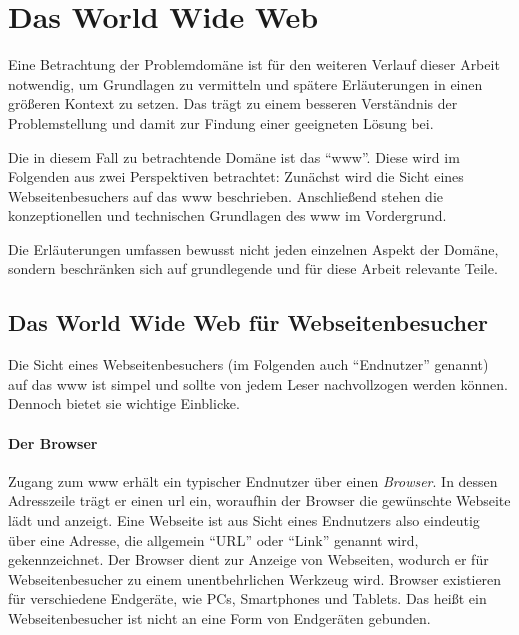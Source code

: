 \section{Das World Wide Web}
    \label{section:TheWWW}
    Eine Betrachtung der Problemdomäne ist für den weiteren
    Verlauf dieser Arbeit notwendig,
    um Grundlagen zu vermitteln und spätere Erläuterungen
    in einen größeren Kontext zu setzen.
    Das trägt zu einem besseren Verständnis der Problemstellung
    und damit zur Findung einer geeigneten Lösung bei.
    

    Die in diesem Fall zu betrachtende Domäne ist das "`\gls{www}"'.
    Diese wird im Folgenden aus zwei Perspektiven betrachtet:
    Zunächst wird die Sicht eines Webseitenbesuchers auf das \gls{www} beschrieben.
    Anschließend stehen die konzeptionellen und technischen Grundlagen
    des \gls{www} im Vordergrund.

    Die Erläuterungen umfassen bewusst nicht jeden einzelnen Aspekt der Domäne,
    sondern beschränken sich auf grundlegende und für diese Arbeit relevante Teile.

    \subsection{Das World Wide Web für Webseitenbesucher}
        \label{section:enduserViewOnWWW}
        Die Sicht eines Webseitenbesuchers (im Folgenden auch "`Endnutzer"' genannt)
        auf das \gls{www} ist simpel und sollte von jedem Leser nachvollzogen werden können.
        Dennoch bietet sie wichtige Einblicke.

        \paragraph*{Der Browser}
        Zugang zum \gls{www} erhält ein typischer Endnutzer über einen \textit{Browser}.
        In dessen Adresszeile trägt er einen \gls{url} ein,
        woraufhin der Browser die gewünschte Webseite lädt und anzeigt.
        Eine Webseite ist aus Sicht eines Endnutzers also eindeutig über eine
        Adresse, die allgemein "`URL"' oder "`Link"' genannt wird, gekennzeichnet.
        Der Browser dient zur Anzeige von Webseiten, wodurch er für Webseitenbesucher
        zu einem unentbehrlichen Werkzeug wird.
        Browser existieren für verschiedene Endgeräte,
        wie PCs, Smartphones und Tablets.
        Das heißt ein Webseitenbesucher ist nicht an eine Form von Endgeräten gebunden.

